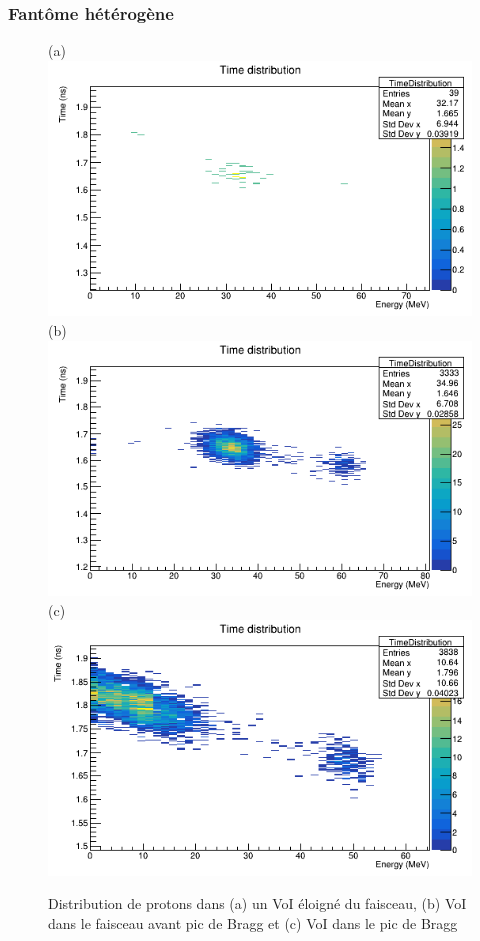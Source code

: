 \documentclass[11pt,a4paper,oldfontcommands]{memoir}
\begin{document}
\subsubsection{Fantôme hétérogène}
\begin{figure}[h!]

\centering
\subfloat(a){\includegraphics[scale=0.3]{Parodi/away.png}}
\subfloat(b){\includegraphics[scale=0.3]{Parodi/preBragg.png}}\\
\subfloat(c){\includegraphics[scale=0.3]{Parodi/Bragg.png}}
\caption{ Distribution de protons dans (a) un VoI éloigné du faisceau, (b) VoI dans le faisceau avant pic de Bragg et (c) VoI dans le pic de Bragg }
\label{hetero prot}
\end{figure}
\end{document}
